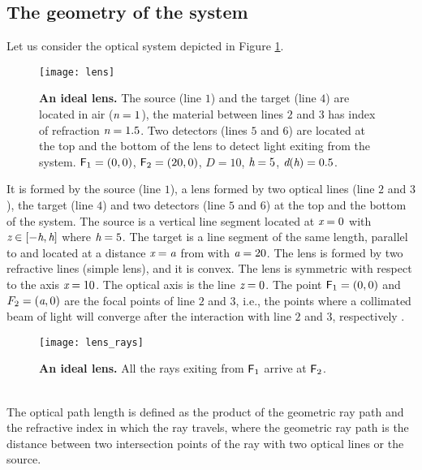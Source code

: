 \subsection{The geometry of the system}
Let us consider the optical system depicted in Figure \ref{fig:lens}. 
\begin{figure}[t]
  \begin{center}
  \texttt{[image: lens]}
  \end{center}
  \caption{\textbf{An ideal lens.} 
The source (line $1$) and the target (line $4$) are located in air ($\textit{n} = 1$), the material between lines $2$ and $3$ has index of refraction $\textit{n}=1.5$. 
Two detectors (lines $5$ and $6$) are located at the top and the bottom of the lens to detect light exiting from the system. $\textsf{F}_1 = (0,0)$, $\textsf{F}_2 = (20,0)$, $D=10$, $\textit{h}=5$, $\textit{d}(\textit{h})=0.5$.}
\label{fig:lens}
 \end{figure}
It is formed by the source (line $1$), a lens formed by two optical lines (line $2$ and $3$), the target (line $4$) and two detectors (line $5$ and $6$) at the top and the bottom of the system. The source  is a vertical line segment located at $\textit{x}=0$ with 
$\textit{z}\in[-\textit{h}, \textit{h}]$ where $\textit{h}=5$. The target  is a line segment of the same length, parallel to  and located at a distance $\textit{x}=\textit{a}$ from  with $\textit{a} = 20$. The lens is formed by two refractive lines (simple lens), and it is convex.
The lens is symmetric with respect to the axis $\textit{x}=10$. The optical axis is the line $\textit{z}=0$. The point $\textsf{F}_1 = (0,0)$ and $F_2 = (\textit{a}, 0)$ are the focal points of line $2$ and $3$, i.e., the points where a collimated beam of light will converge after the interaction with line $2$ and $3$, respectively \cite{leutz2012nonimaging}. 
\begin{figure}[t]
  \begin{center}
  \texttt{[image: lens\_rays]}
  \end{center}
  \caption{\textbf{An ideal lens.} 
All the rays exiting from $\textsf{F}_1$ arrive at $\textsf{F}_2$.}
\label{fig:real-lens}
 \end{figure}
\\ \indent The optical path length is defined as the product of the geometric ray path and the refractive index in which the ray travels, where the geometric ray path is the distance between two intersection points of the ray with two optical lines or the source.
